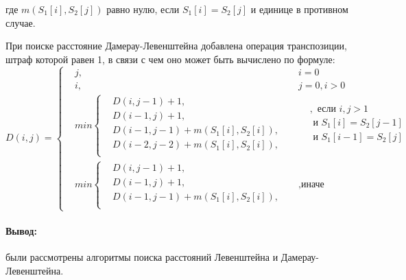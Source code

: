 \begin{flushleft}
	где \(m(S_{1}[i],S_{2}[j])\) равно нулю, если \(S_{1}[i]=S_{2}[j]\) и единице в противном случае.
\end{flushleft}
\par При поиске расстояние Дамерау-Левенштейна добавлена операция транспозиции, штраф которой равен 1, в связи с чем оно может быть вычислено по формуле:
\[ D(i, j) =  \left\{
\begin{aligned}
	&j, && i = 0\\
	&i, && j = 0, i > 0\\		    	
	&min \left\{
	\begin{aligned}
	&D(i, j - 1) + 1,\\
	&D(i - 1, j) + 1,\\
	&D(i - 1, j - 1) + m(S_{1}[i], S_{2}[i]), \\
	&D(i - 2, j - 2) + m(S_{1}[i], S_{2}[i]),\\
	\end{aligned} \right.
	&& 
	\begin{aligned}
	&, \text{ если } i, j > 1 \\
	& \text{ и } S_{1}[i] = S_{2}[j - 1] \\
	& \text{ и } S_{1}[i - 1] =  S_{2}[j] \\
	\end{aligned} \\ 
	&min \left\{
	\begin{aligned}
	&D(i, j - 1) + 1,\\
	&D(i - 1, j) + 1, \\
	&D(i - 1, j - 1) + m(S_{1}[i], S_{2}[i]),\\
	\end{aligned} \right.  &&, \text{иначе}
\end{aligned} \right.
\]
\paragraph{Вывод:} были рассмотрены алгоритмы поиска расстояний Левенштейна и Дамерау-Левенштейна.
